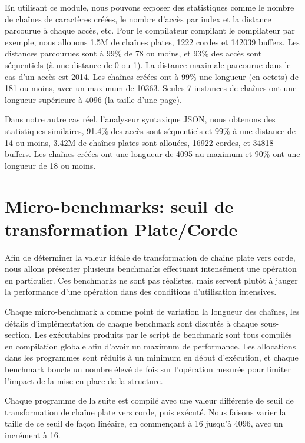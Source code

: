 En utilisant ce module, nous pouvons exposer des statistiques comme le nombre de
chaînes de caractères créées, le nombre d'accès par index et la distance parcourue à chaque accès, etc.
Pour le compilateur compilant le compilateur par exemple, nous allouons 1.5M de chaînes plates, 1222
cordes et 142039 buffers. Les distances parcourues sont à 99\%
de 78 ou moins, et 93\% des accès sont séquentiels (à une distance de 0 ou 1).
La distance maximale parcourue dans le cas d'un accès est 2014.
Les chaînes créées ont à 99\% une longueur (en octets) de 181 ou moins, avec un
maximum de 10363. Seules 7 instances de chaînes ont une longueur supérieure à
4096 (la taille d'une page).

Dans notre autre cas réel, l'analyseur syntaxique JSON, nous obtenons des statistiques
similaires, 91.4\% des accès sont séquentiels et 99\% à une distance de 14 ou moins, 3.42M de
chaînes plates sont allouées, 16922 cordes, et 34818 buffers. Les chaînes créées ont une
longueur de 4095 au maximum et 90\% ont une longueur de 18 ou moins.

\section{Micro-benchmarks: seuil de transformation Plate/Corde}\label{rope_flat_thres_bench}

Afin de déterminer la valeur idéale de transformation de chaine plate vers corde, nous allons présenter
plusieurs benchmarks effectuant intensément une opération en particulier.
Ces benchmarks ne sont pas réalistes, mais servent plutôt à jauger la performance d'une opération
dans des conditions d'utilisation intensives.

Chaque micro-benchmark a comme point de variation la longueur des chaînes, les détails
d'implémentation de chaque benchmark sont discutés à chaque sous-section.
Les exécutables produits par le script de benchmark sont tous compilés en compilation globale
afin d'avoir un maximum de performance.
Les allocations dans les programmes sont réduits à un minimum en début d'exécution, et chaque
benchmark boucle un nombre élevé de fois sur l'opération mesurée pour limiter l'impact
de la mise en place de la structure.

Chaque programme de la suite est compilé avec une valeur différente de seuil de transformation
de chaîne plate vers corde, puis exécuté.
Nous faisons varier la taille de ce seuil de façon linéaire, en commençant à 16 jusqu'à 4096,
avec un incrément à 16.

